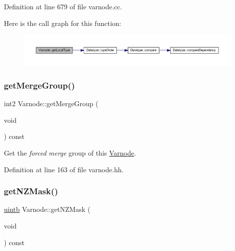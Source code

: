 Definition at line 679 of file varnode.\+cc.

Here is the call graph for this function\+:
\nopagebreak
\begin{figure}[H]
\begin{center}
\leavevmode
\includegraphics[width=350pt]{class_varnode_ae02e0cb9be55fc557361b707068599c5_cgraph}
\end{center}
\end{figure}
\mbox{\label{class_varnode_a8d3e88632d8116fab1c6958feeeec593}} 
\subsubsection{\texorpdfstring{getMergeGroup()}{getMergeGroup()}}
{\footnotesize\ttfamily int2 Varnode\+::get\+Merge\+Group (\begin{DoxyParamCaption}\item[{void}]{ }\end{DoxyParamCaption}) const\hspace{0.3cm}{\ttfamily [inline]}}



Get the {\itshape forced} {\itshape merge} group of this \mbox{\hyperlink{class_varnode}{Varnode}}. 



Definition at line 163 of file varnode.\+hh.

\mbox{\label{class_varnode_a27df81cbc8eab594f0eb4b07f444d037}} 
\subsubsection{\texorpdfstring{getNZMask()}{getNZMask()}}
{\footnotesize\ttfamily \mbox{\hyperlink{types_8h_a2db313c5d32a12b01d26ac9b3bca178f}{uintb}} Varnode\+::get\+N\+Z\+Mask (\begin{DoxyParamCaption}\item[{void}]{ }\end{DoxyParamCaption}) const\hspace{0.3cm}{\ttfamily [inline]}}




